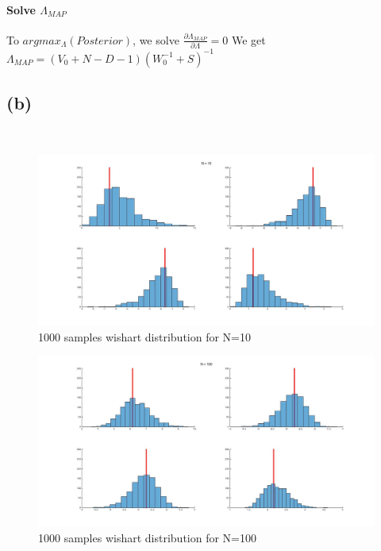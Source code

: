 \documentclass[]{article}
\begin{document}
									\paragraph*{Solve $\Lambda_{MAP}$}
									To $argmax_{\Lambda}(Posterior)$, we solve $\frac{\partial{\Lambda_{MAP}}}{\partial{\Lambda}} = 0$
									We get $\Lambda_{MAP} = (V_{0}+N-D-1)(W_{0}^{-1}+S)^{-1}$			
									\subsection*{(b)}\mbox{}\\
										\begin{figure}[H]
											\centering
											\includegraphics[width=1.2\linewidth]{2b1}
											\caption{1000 samples wishart distribution for N=10}
											\label{fig:2b1}
										\end{figure}	
										\begin{figure}[H]
											\centering
											\includegraphics[width=1.2\linewidth]{2b2}
											\caption{1000 samples wishart distribution for N=100}
											\label{fig:2b2}
										\end{figure}	
\end{document}
